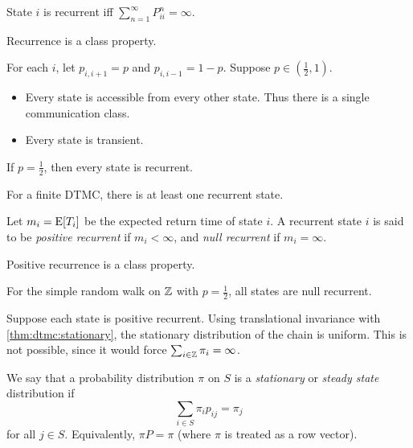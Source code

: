 \begin{exercise}
    State $i$ is recurrent iff $\sum_{n=1}^\infty P_{ii}^n = \infty$.
\end{exercise}

\begin{exercise}
    Recurrence is a class property.
\end{exercise}

\begin{example}
    For each $i$, let $p_{i, i+1} = p$ and $p_{i, i-1} = 1-p$.
    Suppose $p \in (\frac12, 1)$.
    \begin{itemize}
        \item Every state is accessible from every other state.
            Thus there is a single communication class.
        \item Every state is transient.
    \end{itemize}
    If $p = \frac12$, then every state is recurrent.
\end{example}

\begin{exercise}
    For a finite DTMC, there is at least one recurrent state.
\end{exercise}

\begin{definition*}
    Let $m_i = \operatorname{\mathrm{E}}[T_i]$ be the expected return time of state $i$.
    A recurrent state $i$ is said to be \emph{positive recurrent} if
    $m_i < \infty$, and \emph{null recurrent} if $m_i = \infty$.
\end{definition*}

\begin{exercise}
    Positive recurrence is a class property.
\end{exercise}

\begin{exercise*}[SSRW on $\Z$]
    For the simple random walk on $\Z$ with $p = \frac12$,
    all states are null recurrent.
\end{exercise*}
\begin{solution}
    Suppose each state is positive recurrent.
    Using translational invariance with \cref{thm:dtmc:stationary},
    the stationary distribution of the chain is uniform.
    This is not possible, since it would force
    $\sum_{i \in \mathbb{Z}} \pi_i = \infty$.
\end{solution}

\begin{definition*}[Stationarity] \label{def:dtmc:stationarity}
    We say that a probability distribution $\pi$ on $S$ is a
    \emph{stationary} or \emph{steady state} distribution if \[
        \sum_{i \in S} \pi_i p_{ij} = \pi_j
    \] for all $j \in S$.
    Equivalently, $\pi P = \pi$ (where $\pi$ is treated as a row vector).
\end{definition*}

